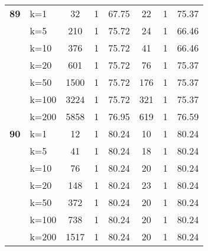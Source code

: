 \begin{table}[htbp]
\begin{tabular}{|l|l|c|c|c|c|c|c|}
    \multicolumn{1}{|r|}{\textbf{89}} & k=1 & 32 & 1 & 67.75 & 22 & 1 & 75.37 \\ 
     & k=5 & 210 & 1 & 75.72 & 24 & 1 & 66.46 \\ 
     & k=10 & 376 & 1 & 75.72 & 41 & 1 & 66.46 \\ 
     & k=20 & 601 & 1 & 75.72 & 76 & 1 & 75.37 \\ 
     & k=50 & 1500 & 1 & 75.72 & 176 & 1 & 75.37 \\ 
     & k=100 & 3224 & 1 & 75.72 & 321 & 1 & 75.37 \\ 
     & k=200 & 5858 & 1 & 76.95 & 619 & 1 & 76.59 \\ \hline
    \multicolumn{1}{|r|}{\textbf{90}} & k=1 & 12 & 1 & 80.24 & 10 & 1 & 80.24 \\ 
     & k=5 & 41 & 1 & 80.24 & 18 & 1 & 80.24 \\ 
     & k=10 & 76 & 1 & 80.24 & 20 & 1 & 80.24 \\ 
     & k=20 & 148 & 1 & 80.24 & 23 & 1 & 80.24 \\ 
     & k=50 & 372 & 1 & 80.24 & 20 & 1 & 80.24 \\ 
     & k=100 & 738 & 1 & 80.24 & 20 & 1 & 80.24 \\ 
     & k=200 & 1517 & 1 & 80.24 & 20 & 1 & 80.24 \\ \hline
    \end{tabular}
\end{table}
